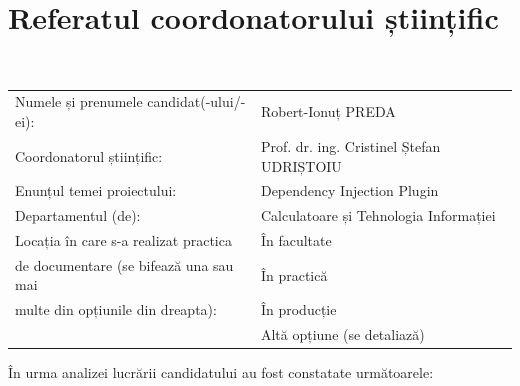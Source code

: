 \chapter*{Referatul coordonatorului științific}
~
\begin{tabular}{l l}
	Numele și prenumele candidat(-ului/-ei):\vspace{10pt} & Robert-Ionuț PREDA \\
	
	Coordonatorul științific:\vspace{10pt}  &	Prof. dr. ing. Cristinel Ștefan UDRIȘTOIU \\
	
	Enunțul temei proiectului:\vspace{10pt} &  Dependency Injection Plugin \\
	
	Departamentul (de):\vspace{10pt} &  Calculatoare și Tehnologia Informației\\
	
	Locația în care s-a realizat practica &\checkedBox\hspace{5pt} În facultate \\ 
	de documentare (se bifează una sau mai &   \hspace{4pt}\unCheckedBox\hspace{5pt} În practică\\
	multe din opțiunile din dreapta): & \hspace{4pt}\unCheckedBox\hspace{5pt} În producție\\
	\vspace{20pt}&\hspace{4pt}\unCheckedBox\hspace{5pt} Altă opțiune (se detaliază)\\
\end{tabular}

\begin{flushleft}
În urma analizei lucrării candidatului au fost constatate următoarele:
\end{flushleft}

